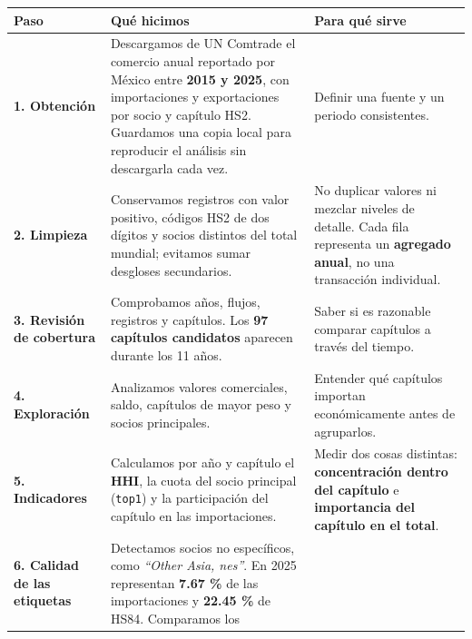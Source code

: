 \documentclass[
]{article}
\newcounter{none} %
\begin{document}
{\def\LTcaptype{none} %
\begin{longtable}[]{@{}
  >{\raggedright\arraybackslash}p{}
  >{\raggedright\arraybackslash}p{}
  >{\raggedright\arraybackslash}p{}@{}}
\toprule\noalign{}
\begin{minipage}[b]{\linewidth}\raggedright
Paso
\end{minipage} & \begin{minipage}[b]{\linewidth}\raggedright
Qué hicimos
\end{minipage} & \begin{minipage}[b]{\linewidth}\raggedright
Para qué sirve
\end{minipage} \\
\midrule\noalign{}
\endhead
\bottomrule\noalign{}
\endlastfoot
\textbf{1. Obtención} & Descargamos de UN Comtrade el comercio anual
reportado por México entre \textbf{2015 y 2025}, con importaciones y
exportaciones por socio y capítulo HS2. Guardamos una copia local para
reproducir el análisis sin descargarla cada vez. & Definir una fuente y
un periodo consistentes. \\
\textbf{2. Limpieza} & Conservamos registros con valor positivo, códigos
HS2 de dos dígitos y socios distintos del total mundial; evitamos sumar
desgloses secundarios. & No duplicar valores ni mezclar niveles de
detalle. Cada fila representa un \textbf{agregado anual}, no una
transacción individual. \\
\textbf{3. Revisión de cobertura} & Comprobamos años, flujos, registros
y capítulos. Los \textbf{97 capítulos candidatos} aparecen durante los
11 años. & Saber si es razonable comparar capítulos a través del
tiempo. \\
\textbf{4. Exploración} & Analizamos valores comerciales, saldo,
capítulos de mayor peso y socios principales. & Entender qué capítulos
importan económicamente antes de agruparlos. \\
\textbf{5. Indicadores} & Calculamos por año y capítulo el \textbf{HHI},
la cuota del socio principal (\texttt{top1}) y la participación del
capítulo en las importaciones. & Medir dos cosas distintas:
\textbf{concentración dentro del capítulo} e \textbf{importancia del
capítulo en el total}. \\
\textbf{6. Calidad de las etiquetas} & Detectamos socios no específicos,
como \emph{``Other Asia, nes''}. En 2025 representan \textbf{7.67 \%} de
las importaciones y \textbf{22.45 \%} de HS84. Comparamos los

\end{longtable}}
\end{document}
